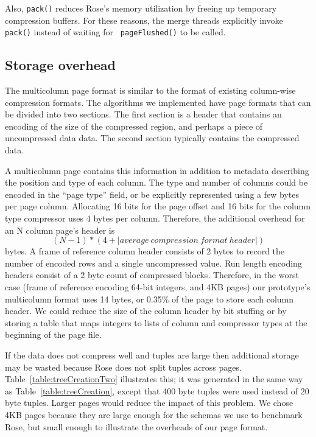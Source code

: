 \documentclass{vldb}
\newcommand{\rows}{Rose\xspace}
\newcommand{\rowss}{Rose's\xspace}
\begin{document}
Also, {\tt pack()} reduces \rowss memory utilization by freeing up
temporary compression buffers.
For these reasons, the merge threads
explicitly invoke {\tt pack()} instead of waiting for {\tt
  pageFlushed()} to be called.


\subsection{Storage overhead}

The multicolumn page format is similar to the format of existing
column-wise compression formats.  The algorithms we implemented have
page formats that can be divided into two sections.
The first section is a header that contains an encoding of the size of
the compressed region, and perhaps a piece of uncompressed data
data.  The second section
typically contains the compressed data.

A multicolumn page contains this information in addition to metadata
describing the position and type of each column.  The type and number
of columns could be encoded in the ``page type'' field, or be
explicitly represented using a few bytes per page column.  Allocating
16 bits for the page offset and 16 bits for the column type compressor
uses 4 bytes per column.  Therefore, the additional overhead for an N
column page's header is
\[
   (N-1) * (4 + |average~compression~format~header|)
\]
bytes.  A frame of reference column header consists of 2 bytes to
record the number of encoded rows and a single uncompressed value. Run
length encoding headers consist of a 2 byte count of compressed
blocks.  Therefore, in the worst case (frame of reference encoding
64-bit integers, and 4KB pages) our prototype's multicolumn format
uses 14 bytes, or 0.35\% of the page to store each column header.  We
could reduce the size of the column header by bit stuffing or by
storing a table that maps integers to lists of column and compressor
types at the beginning of the page file.

If the data does not compress well and tuples are large then additional
storage may be wasted because \rows does not split tuples across
pages.  Table~\ref{table:treeCreationTwo} illustrates this; it was
generated in the same way as Table~\ref{table:treeCreation}, except
that 400 byte tuples were used instead of 20 byte tuples.  Larger
pages would reduce the impact of this problem.  We chose 4KB pages
because they are large enough for the schemas we use to benchmark
\rows, but small enough to illustrate the overheads of our page
format.
\end{document}
